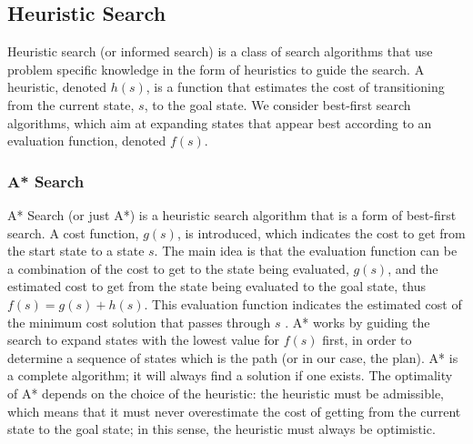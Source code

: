 



\subsection{Heuristic Search}
Heuristic search (or informed search) is a class of search algorithms that use problem specific knowledge in the form of heuristics to guide the search. A heuristic, denoted $h(s)$, is a function that estimates the cost of transitioning from the current state, $s$, to the goal state. We consider best-first search algorithms, which aim at expanding states that appear best according to an evaluation function, denoted $f(s)$. 
\subsubsection{A* Search}
A* Search (or just A*) \cite{4082128} is a heuristic search algorithm that is a form of best-first search. A cost function, $g(s)$, is introduced, which indicates the cost to get from the start state to a state $s$. The main idea is that the evaluation function can be a combination of the cost to get to the state being evaluated, $g(s)$, and the estimated cost to get from the state being evaluated to the goal state, thus $f(s) = g(s) + h(s)$. This evaluation function indicates the estimated cost of the minimum cost solution that passes through $s$ \cite{DBLP:books/aw/RN2020}. A* works by guiding the search to expand states with the lowest value for $f(s)$ first, in order to determine a sequence of states which is the path (or in our case, the plan). A* is a complete algorithm; it will always find a solution if one exists. The optimality of A* depends on the choice of the heuristic: the heuristic must be admissible, which means that it must never overestimate the cost of getting from the current state to the goal state; in this sense, the heuristic must always be optimistic.

